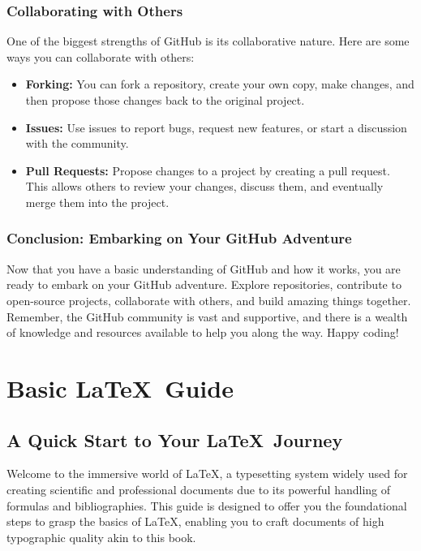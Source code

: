 \documentclass[a4paper,12pt]{book}
\begin{document}
\subsection*{Collaborating with Others}

One of the biggest strengths of GitHub is its collaborative nature. Here are some ways you can collaborate with others:

\begin{itemize}
    \item \textbf{Forking:} You can fork a repository, create your own copy, make changes, and then propose those changes back to the original project.
    \item \textbf{Issues:} Use issues to report bugs, request new features, or start a discussion with the community.
    \item \textbf{Pull Requests:} Propose changes to a project by creating a pull request. This allows others to review your changes, discuss them, and eventually merge them into the project.
\end{itemize}

\subsection*{Conclusion: Embarking on Your GitHub Adventure}

Now that you have a basic understanding of GitHub and how it works, you are ready to embark on your GitHub adventure. Explore repositories, contribute to open-source projects, collaborate with others, and build amazing things together. Remember, the GitHub community is vast and supportive, and there is a wealth of knowledge and resources available to help you along the way. Happy coding!

\chapter{Basic \LaTeX\ Guide}
\section*{A Quick Start to Your \LaTeX\ Journey}

Welcome to the immersive world of \LaTeX, a typesetting system widely used for creating scientific and professional documents due to its powerful handling of formulas and bibliographies. This guide is designed to offer you the foundational steps to grasp the basics of \LaTeX, enabling you to craft documents of high typographic quality akin to this book.
\end{document}
